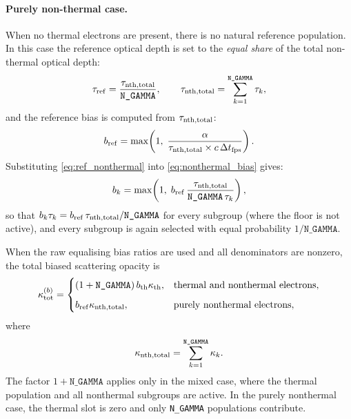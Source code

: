 \documentclass[12pt,a4paper]{article}
\newcommand{\code}[1]{\texttt{#1}}
\begin{document}
\paragraph{Purely non-thermal case.}
When no thermal electrons are present, there is no natural reference
population.  In this case the reference optical depth is set to the
\emph{equal share} of the total non-thermal optical depth:
\begin{equation}
	\tau_{\rm ref} = \frac{\tau_{\rm nth,total}}{\code{N\_GAMMA}},
	\qquad
	\tau_{\rm nth,total} = \sum_{k=1}^{\code{N\_GAMMA}} \tau_k,
	\label{eq:ref_nonthermal}
\end{equation}
and the reference bias is computed from $\tau_{\rm nth,total}$:
\begin{equation}
	b_{\rm ref} = \max\!\left(1,\;
	\frac{\alpha}{\tau_{\rm nth,total} \times c\,\Delta t_{\rm fps}}
	\right).
	\label{eq:bref_nonthermal}
\end{equation}
Substituting \eqref{eq:ref_nonthermal} into \eqref{eq:nonthermal_bias}
gives:
\begin{equation}
	b_k = \max\!\left(1,\; b_{\rm ref}\,
	\frac{\tau_{\rm nth,total}}{\code{N\_GAMMA}\,\tau_k} \right),
	\label{eq:nonthermal_bias_pure}
\end{equation}
so that $b_k \tau_k = b_{\rm ref}\,\tau_{\rm nth,total}/\code{N\_GAMMA}$
for every subgroup (where the floor is not active), and every subgroup
is again selected with equal probability $1/\code{N\_GAMMA}$.

When the raw equalising bias ratios are used and all denominators are
nonzero, the total biased scattering opacity is
\begin{equation}
	\kappa_{\rm tot}^{(b)}
	=
	\begin{cases}
		\left(1+\code{N\_GAMMA}\right)
		b_{\rm th}\kappa_{\rm th},
		& \text{thermal and nonthermal electrons},\\[6pt]
		b_{\rm ref}\kappa_{\rm nth,total},
		& \text{purely nonthermal electrons},
	\end{cases}
	\label{eq:tau_total_correct}
\end{equation}
where
\begin{equation}
	\kappa_{\rm nth,total}
	=
	\sum_{k=1}^{\code{N\_GAMMA}}\kappa_k.
\end{equation}
The factor \(1+\code{N\_GAMMA}\) applies only in the mixed case,
where the thermal population and all nonthermal subgroups are active.
In the purely nonthermal case, the thermal slot is zero and only
\code{N\_GAMMA} populations contribute.
\end{document}
